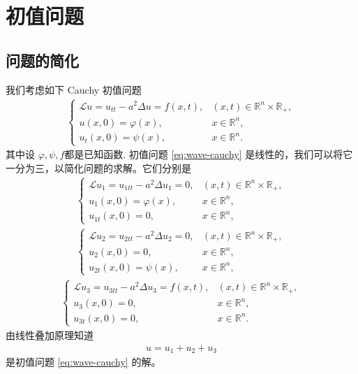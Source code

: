 \documentclass[../../main.tex]{subfiles}%
\begin{document}
\section{初值问题}

\subsection{问题的简化}

\begin{theorem}\label{theorem:Cauchy初值问题的分解}
我们考虑如下 Cauchy 初值问题
\begin{align}
\begin{cases}
\mathcal{L}u=u_{tt}-a^2\Delta u=f(x,t), & (x,t)\in\mathbb{R}^n\times\mathbb{R}_+, \\
u(x,0)=\varphi(x), & x\in\mathbb{R}^n, \\
u_t(x,0)=\psi(x), & x\in\mathbb{R}^n.
\end{cases} \label{eq:wave-cauchy}
\end{align}
其中设 $\varphi,\psi,f$都是已知函数.
初值问题 \eqref{eq:wave-cauchy} 是线性的，我们可以将它一分为三，以简化问题的求解。它们分别是
\begin{align}
\begin{cases}
\mathcal{L}u_1=u_{1tt}-a^2\Delta u_1=0, & (x,t)\in\mathbb{R}^n\times\mathbb{R}_+, \\
u_1(x,0)=\varphi(x), & x\in\mathbb{R}^n, \\
u_{1t}(x,0)=0, & x\in\mathbb{R}^n,
\end{cases} \label{eq:wave-sub1}
\end{align}
\begin{align}
\begin{cases}
\mathcal{L}u_2=u_{2tt}-a^2\Delta u_2=0, & (x,t)\in\mathbb{R}^n\times\mathbb{R}_+, \\
u_2(x,0)=0, & x\in\mathbb{R}^n, \\
u_{2t}(x,0)=\psi(x), & x\in\mathbb{R}^n,
\end{cases} \label{eq:wave-sub2}
\end{align}
\begin{align}
\begin{cases}
\mathcal{L}u_3=u_{3tt}-a^2\Delta u_3=f(x,t), & (x,t)\in\mathbb{R}^n\times\mathbb{R}_+, \\
u_3(x,0)=0, & x\in\mathbb{R}^n, \\
u_{3t}(x,0)=0, & x\in\mathbb{R}^n.
\end{cases} \label{eq:wave-sub3}
\end{align}
由线性叠加原理知道
\begin{align}
u=u_1+u_2+u_3 \label{eq:wave-super}
\end{align}
是初值问题 \eqref{eq:wave-cauchy} 的解。
\end{theorem}
\end{document}
